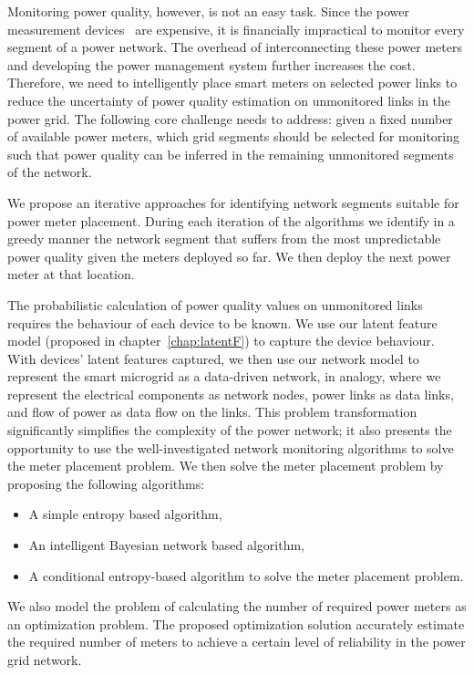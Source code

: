 Monitoring power quality, however, is not an easy task. Since the power measurement devices~\cite{fluke_meter, schneider_meter} are expensive, it is financially impractical to monitor every segment of a power network. The overhead of interconnecting these power meters and developing the power management system further increases the cost. Therefore, we need to intelligently place smart meters on selected power links to reduce the uncertainty of power quality estimation on unmonitored links in the power grid. The following core challenge needs to address: given a fixed number of available power meters, which grid segments should be selected for monitoring such that power quality can be inferred in the remaining unmonitored segments of the network.

We propose an iterative approaches for identifying network segments suitable for power meter placement. During each iteration of the algorithms we identify in a greedy manner the network segment that suffers from the most unpredictable power quality given the meters deployed so far. We then deploy the next power meter at that location.

The probabilistic calculation of power quality values on unmonitored links requires the behaviour of each device to be known. We use our latent feature model (proposed in chapter~\ref{chap:latentF}) to capture the device behaviour. With devices' latent features captured, we then use our network model to represent the smart microgrid as a data-driven network, in analogy, where we represent the electrical components as network nodes, power links as data links, and flow of power as data flow on the links. This problem transformation significantly simplifies the complexity of the power network; it also presents the opportunity to use the well-investigated network monitoring algorithms to solve the meter placement problem. We then solve the meter placement problem by proposing the following algorithms: 
\begin{itemize}
	\item A simple entropy based algorithm, 
	\item An intelligent Bayesian network based algorithm,
	\item A conditional entropy-based algorithm to solve the meter placement problem.
\end{itemize}

We also model the problem of calculating the number of required power meters as an optimization problem. The proposed optimization solution accurately estimate the required number of meters to achieve a certain level of reliability in the power grid network.

